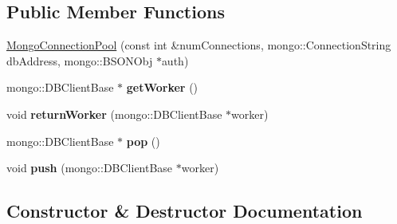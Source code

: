 \subsection*{Public Member Functions}
\begin{DoxyCompactItemize}
\item 
\hyperlink{classrepo_1_1core_1_1handler_1_1connection_pool_1_1_mongo_connection_pool_a545c2e6f439318da4dfc68d7c48e1df1}{Mongo\+Connection\+Pool} (const int \&num\+Connections, mongo\+::\+Connection\+String db\+Address, mongo\+::\+B\+S\+O\+N\+Obj $\ast$auth)
\item 
\hypertarget{classrepo_1_1core_1_1handler_1_1connection_pool_1_1_mongo_connection_pool_af448f2923d7cab7c29e88065395290a6}{}mongo\+::\+D\+B\+Client\+Base $\ast$ {\bfseries get\+Worker} ()\label{classrepo_1_1core_1_1handler_1_1connection_pool_1_1_mongo_connection_pool_af448f2923d7cab7c29e88065395290a6}

\item 
\hypertarget{classrepo_1_1core_1_1handler_1_1connection_pool_1_1_mongo_connection_pool_a42c2d9342df8b7aac1ca4ceff4fa0106}{}void {\bfseries return\+Worker} (mongo\+::\+D\+B\+Client\+Base $\ast$worker)\label{classrepo_1_1core_1_1handler_1_1connection_pool_1_1_mongo_connection_pool_a42c2d9342df8b7aac1ca4ceff4fa0106}

\item 
\hypertarget{classrepo_1_1core_1_1handler_1_1connection_pool_1_1_mongo_connection_pool_a6a5f6613da30e6ba531018fc70fbfd04}{}mongo\+::\+D\+B\+Client\+Base $\ast$ {\bfseries pop} ()\label{classrepo_1_1core_1_1handler_1_1connection_pool_1_1_mongo_connection_pool_a6a5f6613da30e6ba531018fc70fbfd04}

\item 
\hypertarget{classrepo_1_1core_1_1handler_1_1connection_pool_1_1_mongo_connection_pool_ae60f4f074bee5cb799c17363c3d03c38}{}void {\bfseries push} (mongo\+::\+D\+B\+Client\+Base $\ast$worker)\label{classrepo_1_1core_1_1handler_1_1connection_pool_1_1_mongo_connection_pool_ae60f4f074bee5cb799c17363c3d03c38}

\end{DoxyCompactItemize}


\subsection{Constructor \& Destructor Documentation}
\hypertarget{classrepo_1_1core_1_1handler_1_1connection_pool_1_1_mongo_connection_pool_a545c2e6f439318da4dfc68d7c48e1df1}{}
